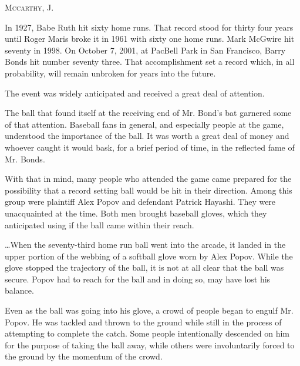 


\opinion \textsc{Mccarthy}, J.


In 1927, Babe Ruth hit sixty home runs. That record stood for thirty four years
until Roger Maris broke it in 1961 with sixty one home runs. Mark McGwire hit
seventy in 1998. On October 7, 2001, at PacBell Park in San Francisco, Barry
Bonds hit number seventy three. That accomplishment set a record which, in all
probability, will remain unbroken for years into the future.

The event was widely anticipated and received a great deal of attention.

The ball that found itself at the receiving end of Mr. Bond's bat garnered some
of that attention. Baseball fans in general, and especially people at the game,
understood the importance of the ball. It was worth a great deal of
money and whoever caught it would bask, for a
brief period of time, in the reflected fame of Mr. Bonds.

With that in mind, many people who attended the game came prepared for the
possibility that a record setting ball would be hit in their direction. Among
this group were plaintiff Alex Popov and defendant Patrick Hayashi. They were
unacquainted at the time. Both men brought baseball gloves, which they
anticipated using if the ball came within their reach.

\ldots When the seventy-third home run ball went into the arcade, it landed in
the upper portion of the webbing of a softball glove worn by Alex Popov. While
the glove stopped the trajectory of the ball, it is not at all clear that the
ball was secure. Popov had to reach for the ball and in doing so, may have lost
his balance.

Even as the ball was going into his glove, a crowd of people began to engulf Mr.
Popov. He was tackled and thrown to the ground while still in the process of
attempting to complete the catch. Some people intentionally descended on him for
the purpose of taking the ball away, while others were involuntarily forced to
the ground by the momentum of the crowd.

